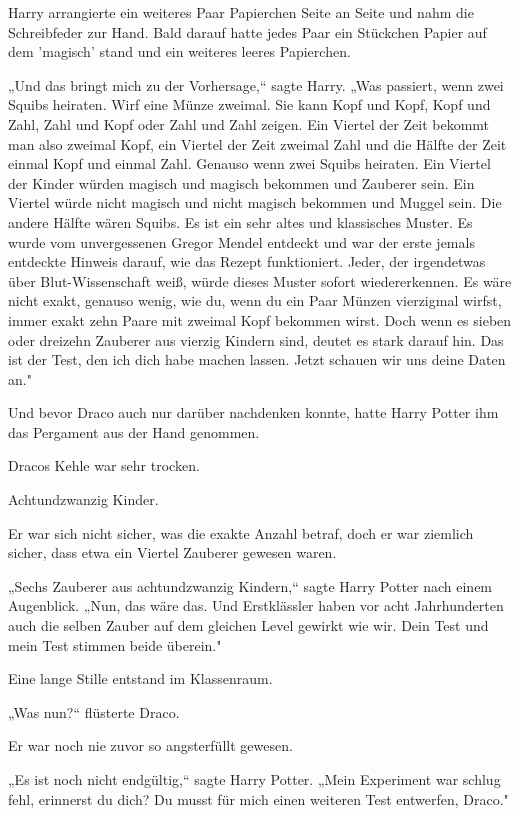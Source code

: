 {Harry arrangierte ein weiteres Paar Papierchen Seite an Seite und nahm die Schreibfeder zur Hand. Bald darauf hatte jedes Paar ein Stückchen Papier auf dem 'magisch' stand und ein weiteres leeres Papierchen.

„Und das bringt mich zu der Vorhersage,“ sagte Harry. „Was passiert, wenn zwei Squibs heiraten. Wirf eine Münze zweimal. Sie kann Kopf und Kopf, Kopf und Zahl, Zahl und Kopf oder Zahl und Zahl zeigen. Ein Viertel der Zeit bekommt man also zweimal Kopf, ein Viertel der Zeit zweimal Zahl und die Hälfte der Zeit einmal Kopf und einmal Zahl. Genauso wenn zwei Squibs heiraten. Ein Viertel der Kinder würden magisch und magisch bekommen und Zauberer sein. Ein Viertel würde nicht magisch und nicht magisch bekommen und Muggel sein. Die andere Hälfte wären Squibs. Es ist ein sehr altes und klassisches Muster. Es wurde vom unvergessenen Gregor Mendel entdeckt und war der erste jemals entdeckte Hinweis darauf, wie das Rezept funktioniert. Jeder, der irgendetwas über Blut-Wissenschaft weiß, würde dieses Muster sofort wiedererkennen. Es wäre nicht exakt, genauso wenig, wie du, wenn du ein Paar Münzen vierzigmal wirfst, immer exakt zehn Paare mit zweimal Kopf bekommen wirst. Doch wenn es sieben oder dreizehn Zauberer aus vierzig Kindern sind, deutet es stark darauf hin. Das ist der Test, den ich dich habe machen lassen. Jetzt schauen wir uns deine Daten an."

Und bevor Draco auch nur darüber nachdenken konnte, hatte Harry Potter ihm das Pergament aus der Hand genommen.

Dracos Kehle war sehr trocken.

Achtundzwanzig Kinder.

Er war sich nicht sicher, was die exakte Anzahl betraf, doch er war ziemlich sicher, dass etwa ein Viertel Zauberer gewesen waren.

„Sechs Zauberer aus achtundzwanzig Kindern,“ sagte Harry Potter nach einem Augenblick. „Nun, das wäre das. Und Erstklässler haben vor acht Jahrhunderten auch die selben Zauber auf dem gleichen Level gewirkt wie wir. Dein Test und mein Test stimmen beide überein."

Eine lange Stille entstand im Klassenraum.

„Was nun?“ flüsterte Draco.

Er war noch nie zuvor so angsterfüllt gewesen.

„Es ist noch nicht endgültig,“ sagte Harry Potter. „Mein Experiment war schlug fehl, erinnerst du dich? Du musst für mich einen weiteren Test entwerfen, Draco."

}
